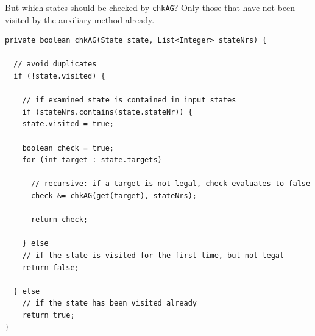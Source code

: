 But which states should be checked by \texttt{chkAG}? Only those that have not been visited by the auxiliary method already.\\

\begin{lstlisting}
private boolean chkAG(State state, List<Integer> stateNrs) {

  // avoid duplicates
  if (!state.visited) {

    // if examined state is contained in input states
    if (stateNrs.contains(state.stateNr)) {
    state.visited = true;

    boolean check = true;
    for (int target : state.targets)
					
      // recursive: if a target is not legal, check evaluates to false
      check &= chkAG(get(target), stateNrs);

      return check;

    } else
    // if the state is visited for the first time, but not legal
    return false;

  } else
    // if the state has been visited already
    return true;
}
\end{lstlisting}





















